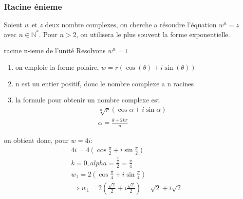 \subsubsection{Racine \'enieme}
Soient $w$ et $z$ deux nombre complexes, on cherche a résoudre l'équation
$w^n = z$ avec $n \in \mathbb{N}^*$. Pour $n>2$, on utilisera le plus souvent la forme exponentielle.

\begin{definition}{racine n-ieme de l'unité}
	Resolvons $w^n = 1$
	\begin{enumerate}
		\item on emploie la forme polaire, $w = r(\cos(\theta)+i\sin(\theta))$ 
		\item n est un entier positif, donc le nombre complexe a n racines
		\item la formule pour obtenir un nombre complexe est 
			\begin{align*}
				\sqrt[n]{r}(\cos\alpha+i\sin\alpha) \\
				\alpha = \frac{\theta+2k\pi}{n}
			\end{align*}
 	\end{enumerate}
	on obtient donc, pour $w = 4i$:
	\begin{align*}
		4i = 4(\cos\frac{\pi}{2}+i\sin\frac{\pi}{2})\\
		k=0, alpha = \frac{\frac{\pi}{2}}{2} =  \frac{\pi}{4} \\
			w_1= 2(\cos\frac{\pi}{4}+i\sin\frac{\pi}{4}) \\
			\Rightarrow w_1 = 2(\frac{\sqrt{2}}{2}+i\frac{\sqrt{2}}{2}) = \sqrt{2}+i\sqrt{2}
	\end{align*}
\end{definition}
